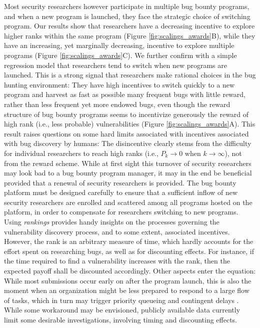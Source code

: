 Most security researchers however participate in multiple bug bounty programs, and when a new program is launched, they face the strategic choice of switching program. Our results show that researchers have a decreasing incentive to explore higher ranks within the same program (Figure \ref{fig:scalings_awards}B), while they have an increasing, yet marginally decreasing, incentive to explore multiple programs (Figure \ref{fig:scalings_awards}C). We further confirm with a simple regression model that researchers tend to switch when new programs are launched. This is a strong signal that researchers make rational choices in the bug hunting environment: They have high incentives to switch quickly to a new program and harvest as fast as possible many frequent bugs with little reward, rather than less frequent yet more endowed bugs, even though the reward structure of bug bounty programs seems to incentivize generously the reward of high rank (i.e., less probable) vulnerabilities (Figure \ref{fig:scalings_awards}A). This result raises questions on some hard limits associated with incentives associated with bug discovery by humans: The disincentive clearly stems from the difficulty for individual researchers to reach high ranks (i.e., $P_{k} \rightarrow 0$ when $k \rightarrow \infty$), not from the reward scheme. While at first sight this turnover of security researchers may look bad to a bug bounty program manager, it may in the end be beneficial provided that a renewal of security researchers is provided. The bug bounty platform must be designed carefully to ensure that a sufficient inflow of new security researchers are enrolled and scattered among all programs hosted on the platform, in order to compensate for researchers switching to new programs.\\

Using {\it rankings} provides handy insights on the processes governing the vulnerability discovery process, and to some extent, associated incentives. However, the rank is an arbitrary measure of time, which hardly accounts for the effort spent on researching bugs, as well as for discounting effects. For instance, if the time required to find a vulnerability increases with the rank, then the expected payoff shall be discounted accordingly. Other aspects enter the equation: While most submissions occur early on after the program launch, this is also the moment when an organization might be less prepared to respond to a large flow of tasks, which in turn may trigger priority queueing and contingent delays \cite{maillart2011quantification}. While some workaround may be envisioned, publicly available data currently limit some desirable investigations, involving timing and discounting effects.\\


